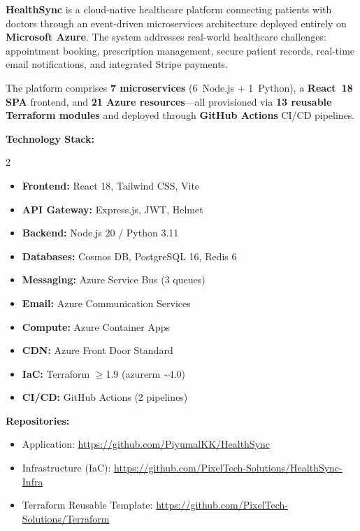 \documentclass[12pt,a4paper]{article}
\begin{document}
\textbf{HealthSync} is a cloud-native healthcare platform connecting patients with doctors through an event-driven microservices architecture deployed entirely on \textbf{Microsoft Azure}. The system addresses real-world healthcare challenges: appointment booking, prescription management, secure patient records, real-time email notifications, and integrated Stripe payments.

\noindent The platform comprises \textbf{7 microservices} (6~Node.js + 1~Python), a \textbf{React~18 SPA} frontend, and \textbf{21 Azure resources}---all provisioned via \textbf{13 reusable Terraform modules} and deployed through \textbf{GitHub Actions} CI/CD pipelines.

\smallskip
\noindent\textbf{Technology Stack:}
\begin{multicols}{2}
\begin{itemize}[noitemsep,topsep=0pt]
    \item \textbf{Frontend:} React 18, Tailwind CSS, Vite
    \item \textbf{API Gateway:} Express.js, JWT, Helmet
    \item \textbf{Backend:} Node.js 20 / Python 3.11
    \item \textbf{Databases:} Cosmos DB, PostgreSQL 16, Redis 6
    \item \textbf{Messaging:} Azure Service Bus (3 queues)
    \item \textbf{Email:} Azure Communication Services
    \item \textbf{Compute:} Azure Container Apps
    \item \textbf{CDN:} Azure Front Door Standard
    \item \textbf{IaC:} Terraform $\geq$1.9 (azurerm \textasciitilde4.0)
    \item \textbf{CI/CD:} GitHub Actions (2 pipelines)
\end{itemize}
\end{multicols}

\noindent\textbf{Repositories:}
\begin{itemize}[noitemsep,topsep=2pt]
    \item Application: \url{https://github.com/PiyumalKK/HealthSync}
    \item Infrastructure (IaC): \url{https://github.com/PixelTech-Solutions/HealthSync-Infra}
    \item Terraform Reusable Template: \url{https://github.com/PixelTech-Solutions/Terraform}
\end{itemize}
\end{document}

